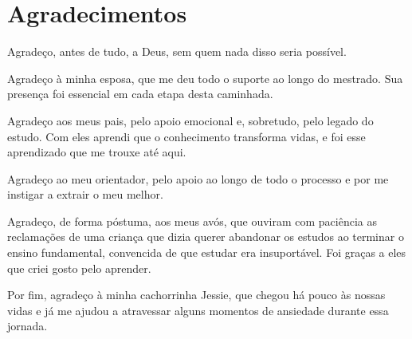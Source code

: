 \chapter*{Agradecimentos}

Agradeço, antes de tudo, a Deus, sem quem nada disso seria possível.

Agradeço à minha esposa, que me deu todo o suporte ao longo do mestrado. Sua presença foi essencial em cada etapa desta caminhada.

Agradeço aos meus pais, pelo apoio emocional e, sobretudo, pelo legado do estudo. Com eles aprendi que o conhecimento transforma vidas, e foi esse aprendizado que me trouxe até aqui.

Agradeço ao meu orientador, pelo apoio ao longo de todo o processo e por me instigar a extrair o meu melhor.

Agradeço, de forma póstuma, aos meus avós, que ouviram com paciência as reclamações de uma criança que dizia querer abandonar os estudos ao terminar o ensino fundamental, convencida de que estudar era insuportável. Foi graças a eles que criei gosto pelo aprender.

Por fim, agradeço à minha cachorrinha Jessie, que chegou há pouco às nossas vidas e já me ajudou a atravessar alguns momentos de ansiedade durante essa jornada.
